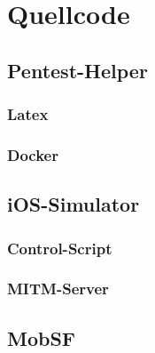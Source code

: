 
\appendix
\chapter{Quellcode}

\section{Pentest-Helper}
\subsection{Latex}\label{ap:FragTex}
\lstset{language=TeX}




\subsection{Docker}\label{ap:Docker}


\section{iOS-Simulator}
\subsection{Control-Script}\label{ap:simcontrol}
\lstset{language=Python}

\subsection{MITM-Server}\label{ap:mitmserver}
\lstset{language=Python}


\section{MobSF}
%

